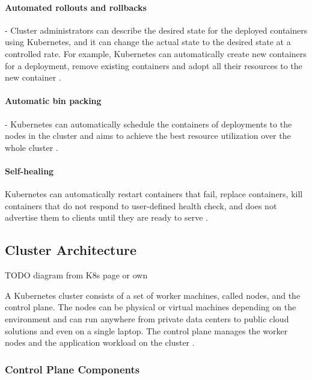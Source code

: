 \paragraph{Automated rollouts and rollbacks} - Cluster administrators can describe the desired state for the deployed containers using Kubernetes, and it can change the actual state to the desired state at a controlled rate. For example, Kubernetes can automatically create new containers for a deployment, remove existing containers and adopt all their resources to the new container \cite{KubernetesOverview}.

\paragraph{Automatic bin packing} - Kubernetes can automatically schedule the containers of deployments to the nodes in the cluster and aims to achieve the best resource utilization over the whole cluster \cite{KubernetesOverview}.

\paragraph{Self-healing} Kubernetes can automatically restart containers that fail, replace containers, kill containers that do not respond to user-defined health check, and does not advertise them to clients until they are ready to serve \cite{KubernetesOverview}.

\subsection{Cluster Architecture}

TODO
diagram from K8s page or own


A Kubernetes cluster consists of a set of worker machines, called nodes, and the control plane. The nodes can be physical or virtual machines depending on the environment and can run anywhere from private data centers to public cloud solutions and even on a single laptop. The control plane manages the worker nodes and the application workload on the cluster \cite{KubernetesArchitecture}.

\subsubsection{Control Plane Components}

